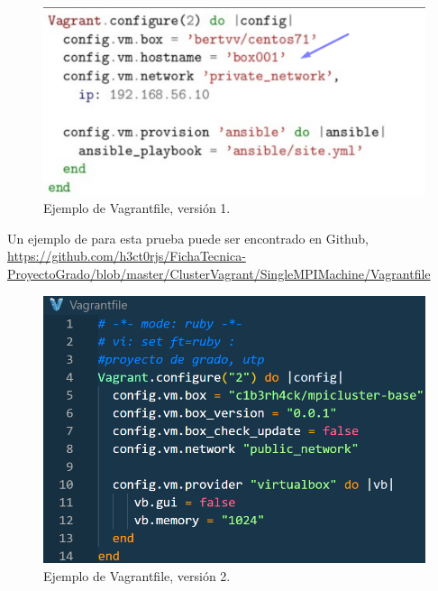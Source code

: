 \documentclass[letterpaper, 12pt, oneside]{article}
\begin{document}
    \begin{figure}[H]
        \includegraphics[scale=1.0]{img/install/vagrantfile.png}
        \caption{Ejemplo de Vagrantfile, versión 1. }
        \label{fig:vagrantfile1}
    \end{figure}
    Un ejemplo de para esta prueba puede ser encontrado en Github,  \url{https://github.com/h3ct0rjs/FichaTecnica-ProyectoGrado/blob/master/ClusterVagrant/SingleMPIMachine/Vagrantfile}
    \begin{figure}[H]
        \includegraphics[scale=1.2]{img/provision/vagrantbox.png}
        \caption{Ejemplo de Vagrantfile, versión 2. }
        \label{fig:vafile2}
    \end{figure}
    
\end{document}
